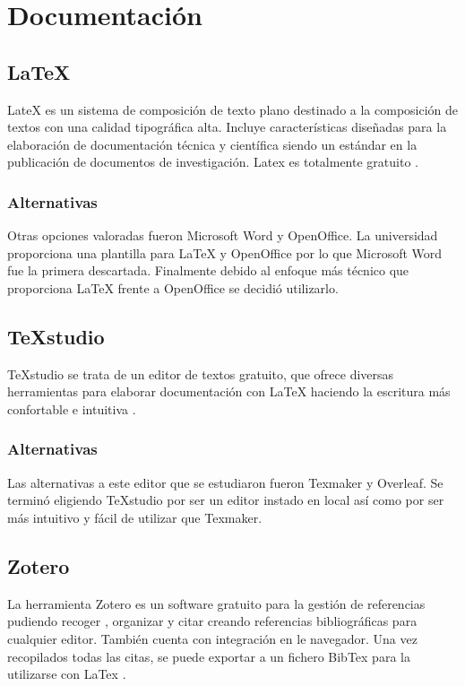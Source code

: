 \section{Documentación}\label{Documentación}
	\subsection{LaTeX}\label{LaTex}
LateX es un sistema de composición de texto plano destinado a la composición de textos con una calidad tipográfica alta. Incluye características diseñadas para la elaboración de documentación técnica y científica siendo un estándar en la publicación de documentos de investigación. Latex es totalmente gratuito \cite{latex}.
	\subsubsection{Alternativas}\label{AlternativasLatex}
Otras opciones valoradas fueron Microsoft Word y OpenOffice. La universidad proporciona una plantilla para LaTeX y OpenOffice por lo que Microsoft Word fue la primera descartada. Finalmente debido al enfoque más técnico que proporciona LaTeX frente a OpenOffice se decidió utilizarlo.

	\subsection{TeXstudio}\label{Texmaker}
TeXstudio se trata de un editor de textos gratuito, que ofrece diversas herramientas para elaborar documentación con LaTeX haciendo la escritura más confortable e intuitiva \cite{texstudio}.
	\subsubsection{Alternativas}\label{AlternativasTexmaker}
Las alternativas a este editor que se estudiaron fueron Texmaker y Overleaf. Se terminó eligiendo TeXstudio por ser un editor instado en local así como por ser más intuitivo y fácil de utilizar que Texmaker.

	\subsection{Zotero}\label{zotero}
La herramienta Zotero es un software gratuito para la gestión de referencias pudiendo recoger , organizar y citar creando referencias bibliográficas para cualquier editor. También cuenta con integración en le navegador. Una vez recopilados todas las citas, se puede exportar a un fichero BibTex para la utilizarse con LaTex \cite{zotero}.


